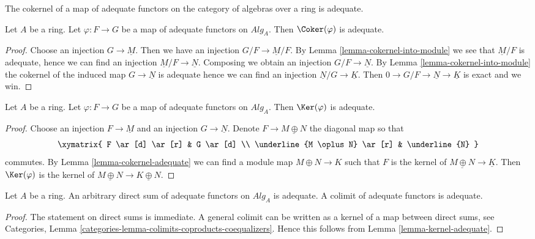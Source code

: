 \begin{lemma}
\label{lemma-cokernel-adequate}
\begin{slogan}
The cokernel of a map of adequate functors on the category of algebras
over a ring is adequate.
\end{slogan}
Let $A$ be a ring.
Let $\varphi : F \to G$ be a map of adequate functors on $\textit{Alg}_A$.
Then $\Coker(\varphi)$ is adequate.
\end{lemma}

\begin{proof}
Choose an injection $G \to \underline{M}$.
Then we have an injection $G/F \to \underline{M}/F$. By
Lemma \ref{lemma-cokernel-into-module}
we see that $\underline{M}/F$ is adequate, hence we can find an injection
$\underline{M}/F \to \underline{N}$.
Composing we obtain an injection $G/F \to \underline{N}$. By
Lemma \ref{lemma-cokernel-into-module}
the cokernel of the induced map $G \to \underline{N}$ is adequate
hence we can find an injection $\underline{N}/G \to \underline{K}$.
Then $0 \to G/F \to \underline{N} \to \underline{K}$ is exact and
we win.
\end{proof}

\begin{lemma}
\label{lemma-kernel-adequate}
Let $A$ be a ring.
Let $\varphi : F \to G$ be a map of adequate functors on $\textit{Alg}_A$.
Then $\Ker(\varphi)$ is adequate.
\end{lemma}

\begin{proof}
Choose an injection $F \to \underline{M}$ and an injection
$G \to \underline{N}$. Denote $F \to \underline{M \oplus N}$
the diagonal map so that
$$
\xymatrix{
F \ar[d] \ar[r] & G \ar[d] \\
\underline{M \oplus N} \ar[r] & \underline{N}
}
$$
commutes. By
Lemma \ref{lemma-cokernel-adequate}
we can find a module map $M \oplus N \to K$ such that
$F$ is the kernel of $\underline{M \oplus N} \to \underline{K}$.
Then $\Ker(\varphi)$ is the kernel of
$\underline{M \oplus N} \to \underline{K \oplus N}$.
\end{proof}

\begin{lemma}
\label{lemma-colimit-adequate}
Let $A$ be a ring.
An arbitrary direct sum of adequate functors on $\textit{Alg}_A$
is adequate. A colimit of adequate functors is adequate.
\end{lemma}

\begin{proof}
The statement on direct sums is immediate.
A general colimit can be written as a kernel of a map between
direct sums, see
Categories, Lemma \ref{categories-lemma-colimits-coproducts-coequalizers}.
Hence this follows from
Lemma \ref{lemma-kernel-adequate}.
\end{proof}

